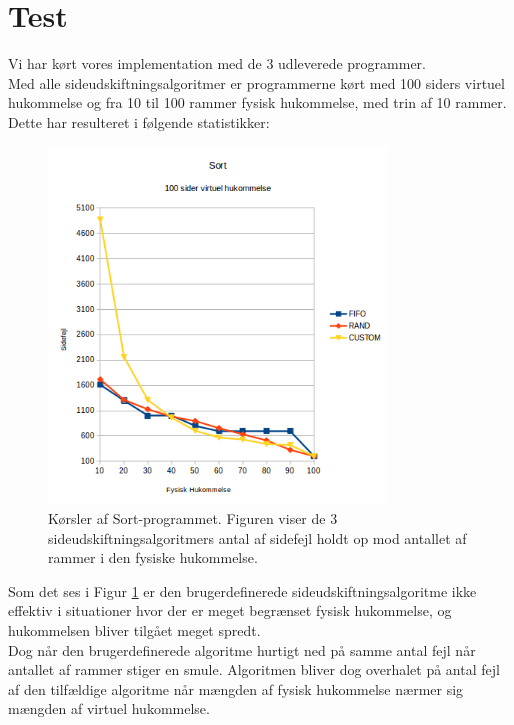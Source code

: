 \section{Test}
Vi har kørt vores implementation med de 3 udleverede programmer.\\

Med alle sideudskiftningsalgoritmer er programmerne kørt med 100 siders virtuel hukommelse og fra 10 til 100 rammer fysisk hukommelse, med trin af 10 rammer. Dette har resulteret i følgende statistikker:

\begin{figure}[H]
	\centering
	\includegraphics[width=0.8\textwidth]{figures/SortStatistic.png}
	\caption{Kørsler af Sort-programmet. Figuren viser de 3 sideudskiftningsalgoritmers antal af sidefejl holdt op mod antallet af rammer i den fysiske hukommelse.}
	\label{fig:sortstatistic}
\end{figure}

Som det ses i Figur \ref{fig:sortstatistic} er den brugerdefinerede sideudskiftningsalgoritme ikke effektiv i situationer hvor der er meget begrænset fysisk hukommelse, og hukommelsen bliver tilgået meget spredt.\\

Dog når den brugerdefinerede algoritme hurtigt ned på samme antal fejl når antallet af rammer stiger en smule. Algoritmen bliver dog overhalet på antal fejl af den tilfældige algoritme når mængden af fysisk hukommelse nærmer sig mængden af virtuel hukommelse.\\

